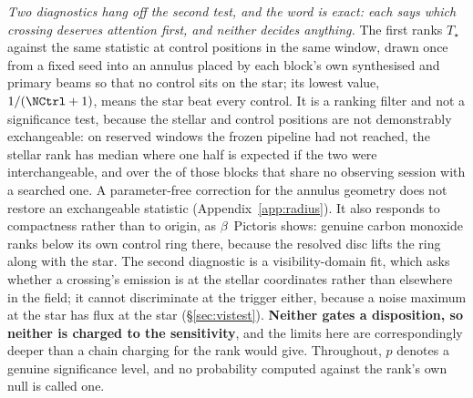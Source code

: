\emph{Two diagnostics hang off the second test, and the word is exact: each
says which crossing deserves attention first, and neither decides anything.}
The first ranks $T_\star$ against the same statistic at \NCtrl{} control
positions in the same window, drawn once from a fixed seed into an annulus
placed by each block's own synthesised and primary beams so that no control
sits on the star; its lowest value, $1/(\NCtrl+1)$, means the star beat every
control. It is a ranking filter and not a significance test, because the
stellar and control positions are not demonstrably exchangeable: on
\HoWin{} reserved windows the frozen pipeline had not reached, the stellar
rank has median \HoRankMed{} where one half is expected if the two were
interchangeable, and \HsIndRankMed{} over the \HsIndBlocks{} of those blocks
that share no observing session with a searched one. A parameter-free
correction for the annulus geometry does not restore an exchangeable
statistic (Appendix~\ref{app:radius}). It
also responds to compactness rather than to origin, as $\beta$~Pictoris
shows: genuine carbon monoxide ranks below its own control ring there,
because the resolved disc lifts the ring along with the star. The second
diagnostic is a visibility-domain fit, which asks whether a crossing's
emission is at the stellar coordinates rather than elsewhere in the field; it
cannot discriminate at the trigger either, because a noise maximum at the
star has flux at the star (\S\ref{sec:vistest}). \textbf{Neither gates a
disposition, so neither is charged to the sensitivity}, and the limits here
are correspondingly deeper than a chain charging for the rank would give.
Throughout, $p$ denotes a genuine significance level, and no probability
computed against the rank's own null is called one.


